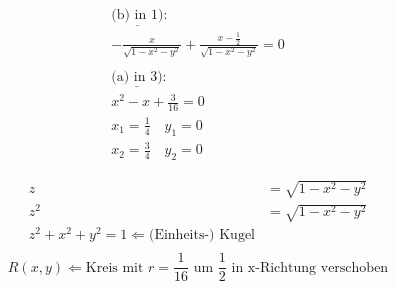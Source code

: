 \begin{align*}
    \underline{\text{(b) in } 1)}: \\
    - \frac{x}{\sqrt{1 - x^2 - y^2}} + \frac{x - \frac{1}{2}}{\sqrt{1 - x^2 - y^2}} = 0 \\ %
    \\
    \underline{\text{(a) in } 3)}: \\
    x^2 - x + \frac{3}{16} = 0 \\
    x_1 = \frac{1}{4} \quad y_1 = 0 \\
    x_2 = \frac{3}{4} \quad y_2 = 0
\end{align*}

\begin{align*}
    z &= \sqrt{1 - x^2 - y^2} \\
    z^2 &= \sqrt{1 - x^2 - y^2} \\
    z^2 + x^2 + y^2 = 1 \Leftarrow \text{(Einheits-) Kugel} \\
\end{align*}
\[
    R(x,y) \Leftarrow \text{Kreis mit } r = \frac{1}{16} \text{ um } \frac{1}{2} \text{ in x-Richtung verschoben}
\]

